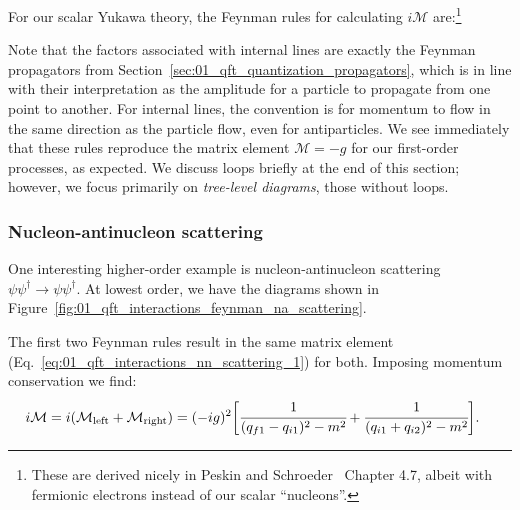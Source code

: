 \begin{definition}
For our scalar Yukawa theory, the Feynman rules for calculating $i\mathcal M$ are:\footnote{These are derived nicely in Peskin and Schroeder~\cite{Peskin:1995ev} Chapter 4.7, albeit with fermionic electrons instead of our scalar ``nucleons''.}

\end{definition}
Note that the factors associated with internal lines are exactly the Feynman propagators from Section~\ref{sec:01_qft_quantization_propagators}, which is in line with their interpretation as the amplitude for a particle to propagate from one point to another.
For internal lines, the convention is for momentum to flow in the same direction as the particle flow, even for antiparticles.
We see immediately that these rules reproduce the matrix element $\mathcal M = -g$ for our first-order processes, as expected.
We discuss loops briefly at the end of this section; however, we focus primarily on \textit{tree-level diagrams}, those without loops.

\subsubsection{Nucleon-antinucleon scattering}

One interesting higher-order example is nucleon-antinucleon scattering $\psi\psi^\dagger \rightarrow \psi\psi^\dagger$.
At lowest order, we have the diagrams shown in Figure~\ref{fig:01_qft_interactions_feynman_na_scattering}.



The first two Feynman rules result in the same matrix element (Eq.~\ref{eq:01_qft_interactions_nn_scattering_1}) for both.
Imposing momentum conservation we find:
\begin{equation}
	\label{eq:01_qft_interactions_na_scattering}
	\begin{split}
		i \mathcal M = i(\mathcal M_\mathrm{left} + \mathcal M_\mathrm{right}) &= (-ig)^2 \bigg[ \cfrac{1}{(q_{f1} - q_{i1})^2 - m^2} + \cfrac{1}{(q_{i1} + q_{i2})^2 - m^2} \bigg]. 
	\end{split}
\end{equation}



